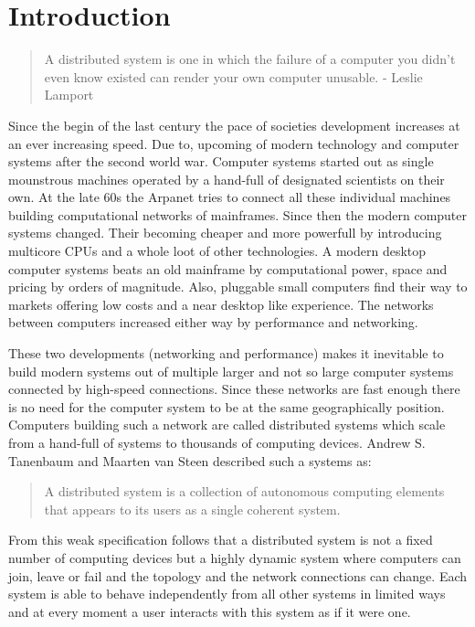 
\section{Introduction}
\label{sec_1}

\begin{quote}
A distributed system is one in which the failure of a computer you didn't even
know existed can render your own computer unusable. - Leslie Lamport
\end{quote}

Since the begin of the last century the pace of societies development increases
at an ever increasing speed. Due to, upcoming of modern technology and computer
systems after the second world war. Computer systems started out as single
mounstrous machines operated by a hand-full of designated scientists on
their own. At the late 60s the Arpanet tries to connect all these individual
machines building computational networks of mainframes. Since then the
modern computer systems changed. Their becoming cheaper and more powerfull
by introducing multicore CPUs and a whole loot of other technologies.
A modern desktop computer systems beats an old mainframe by computational power,
space and pricing by orders of magnitude. Also, pluggable small computers
find their way to markets offering low costs and a near desktop like experience.
The networks between computers increased either way by performance and
networking.

These two developments (networking and performance) makes it inevitable
to build modern systems out of multiple larger and not so large computer
systems connected by high-speed connections. Since these networks are fast
enough there is no need for the computer system to be at the same geographically
position. Computers building such a network are called distributed systems
which scale from a hand-full of systems to thousands of computing devices. 
Andrew S. Tanenbaum and Maarten van Steen described such a systems as:

\begin{quote}
  A distributed system is a collection of autonomous computing elements
  that appears to its users as a single coherent system.~\cite{tanenbaum2017distributed}
\end{quote}

From this weak specification follows that a distributed system is not a fixed
number of computing devices but a highly dynamic system where computers can
join, leave or fail and the topology and the network connections can change.
Each system is able to behave independently from all other systems in limited
ways and at every moment a user interacts with this system as if it were one.

